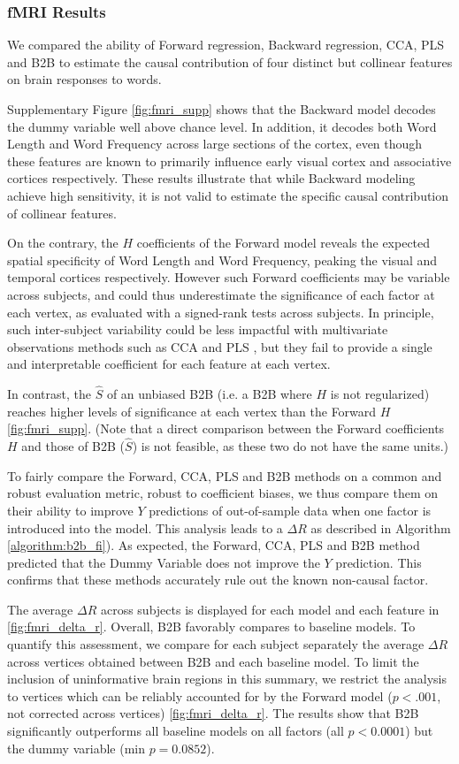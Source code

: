 \subsubsection{fMRI Results}
We compared the ability of Forward regression, Backward regression, CCA, PLS
and B2B to estimate the causal contribution of four distinct but collinear
features on brain responses to words.

Supplementary Figure \ref{fig:fmri_supp} shows that the Backward model decodes
the dummy variable well above chance level. In addition, it decodes both Word
Length and Word Frequency across large sections of the cortex, even though
these features are known to primarily influence early visual cortex and
associative cortices respectively. These results illustrate that while Backward
modeling achieve high sensitivity, it is not valid to estimate the specific
causal contribution of collinear features.

On the contrary, the $H$
coefficients of the Forward model reveals the expected spatial specificity of
Word Length and Word Frequency, peaking the visual and temporal cortices
respectively. However such Forward coefficients may be variable across
subjects, and could thus underestimate the significance of each factor at each
vertex, as evaluated with a  signed-rank tests across subjects. In principle, such
inter-subject variability could be less impactful with
multivariate observations methods such as CCA and PLS \citep{bilenko2016pyrcca,
king2018encoding}, but they fail to provide a single and interpretable coefficient
for each feature at each vertex.

In contrast, the $\hat S$ of an unbiased B2B (i.e. a B2B where $H$ is not
regularized) reaches higher levels of significance at each vertex
than the Forward $H$ \ref{fig:fmri_supp}. (Note that a direct
comparison between the Forward coefficients $H$ and those of B2B ($\hat S$)
is not feasible, as these two do not have the same units.)

To fairly compare the Forward, CCA, PLS and B2B methods on a common and robust
evaluation metric, robust to coefficient biases, we thus compare them on their ability to improve $Y$
predictions of out-of-sample data when one factor is introduced into the model.
This analysis leads to a $\Delta R$ as described in Algorithm
\ref{algorithm:b2b_fi}). As expected, the Forward, CCA, PLS
and B2B method predicted that the Dummy Variable does not improve the $Y$
prediction. This confirms that these methods accurately rule out the known
non-causal factor.

The average $\Delta R$ across subjects is displayed for each model and each
feature in \ref{fig:fmri_delta_r}. Overall, B2B favorably compares to baseline models.
To quantify this assessment, we compare for each subject separately
the average $\Delta R$ across vertices obtained between B2B and each
baseline model. To limit the inclusion of uninformative brain regions in this
summary, we restrict the analysis to vertices which can be reliably accounted
for by the Forward model ($p<.001$, not corrected across vertices)
\ref{fig:fmri_delta_r}. The results show that B2B significantly outperforms all
baseline models on all factors (all $p<0.0001$) but the dummy variable
(min $p=0.0852$).
